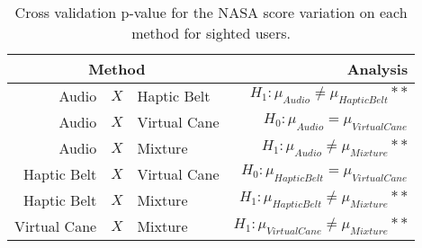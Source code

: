 
\begin{table}[!htb]
\centering
\caption{Cross validation p-value for the NASA score variation on each method for sighted users.}
\label{tab:lsdbloc_nasa_var_sight}
\begin{tabular}{rclr}
\toprule
      \multicolumn{3}{c}{Method} &                                       Analysis \\
\midrule
       Audio & $X$ & Haptic Belt &    $H_1 : \mu_{Audio} \ne \mu_{Haptic Belt}**$ \\
      Audio & $X$ & Virtual Cane &       $H_0 : \mu_{Audio} = \mu_{Virtual Cane}$ \\
           Audio & $X$ & Mixture &        $H_1 : \mu_{Audio} \ne \mu_{Mixture}**$ \\
Haptic Belt & $X$ & Virtual Cane & $H_0 : \mu_{Haptic Belt} = \mu_{Virtual Cane}$ \\
     Haptic Belt & $X$ & Mixture &  $H_1 : \mu_{Haptic Belt} \ne \mu_{Mixture}**$ \\
    Virtual Cane & $X$ & Mixture & $H_1 : \mu_{Virtual Cane} \ne \mu_{Mixture}**$ \\
\bottomrule
\end{tabular}
\end{table}

